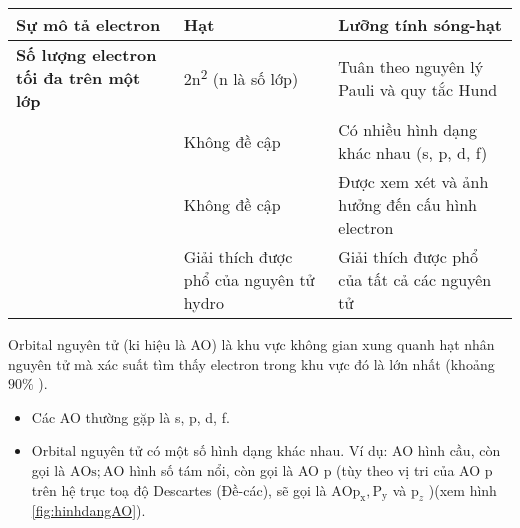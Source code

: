 \begin{hoivadap}
{\begin{longtable}{|C{0.25\textwidth}|p{0.33\textwidth}|p{0.33\textwidth}|}
			\hline
			\textcolor{\maunhan}{\textbf{Sự mô tả electron}} & Hạt & Lưỡng tính sóng-hạt \\
			\hline
			\textcolor{\maunhan}{\textbf{Số lượng electron tối đa trên một lớp}} & 2n\textsuperscript{2} (n là số lớp) & Tuân theo nguyên lý Pauli và quy tắc Hund \\
			\hline
			 & Không đề cập & Có nhiều hình dạng khác nhau (s, p, d, f) \\
			\hline
			 & Không đề cập & Được xem xét và ảnh hưởng đến cấu hình electron \\
			\hline
			 & Giải thích được phổ của nguyên tử hydro & Giải thích được phổ của tất cả các nguyên tử \\
		\end{longtable}
	}
\end{hoivadap}
\vspace{0.5cm}
\begin{tomtat}
	Orbital nguyên tử (ki hiệu là AO) là khu vực không gian xung quanh hạt nhân nguyên tử mà xác suất tìm thấy electron trong khu vực đó là lớn nhất (khoảng $90 \%$ ).
\end{tomtat}
\begin{hopvidu}[\maunhan]
	\begin{itemize}
		\item Các AO thường gặp là s, p, d, f.
		\item Orbital nguyên tử có một số hình dạng khác nhau. Ví dụ: AO hình cầu, còn gọi là $\mathrm{AO} \mathrm{s} ; \mathrm{AO}$ hình số tám nổi, còn gọi là AO p (tùy theo vị tri của AO p trên hệ trục toạ độ Descartes (Đề-các), sẽ gọi là $\mathrm{AO} \mathrm{p}_{\mathrm{x}}, \mathrm{P}_{\mathrm{y}}$ và $\mathrm{p}_z$ )(xem hình \ref{fig:hinhdangAO}).
	\end{itemize}
\end{hopvidu}
